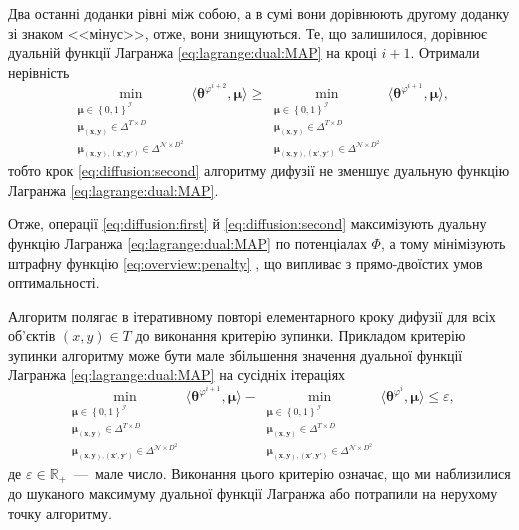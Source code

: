 Два останні доданки рівні між собою,
а в сумі вони дорівнюють другому доданку зі знаком <<мінус>>, отже,
вони знищуються.
Те, що залишилося,
дорівнює дуальній функції Лагранжа \eqref{eq:lagrange:dual:MAP}
на кроці $i + 1$.
Отримали нерівність
\begin{equation*}
    \min \limits_{\substack{\pmb{\mu} \in \left\{ 0, 1 \right\}^{\mathcal{I}} \\
                            \pmb{\mu_{\left(x, y \right)}} \in \Delta^{T \times D} \\
                            \pmb{\mu_{\left(x, y \right), \left(x', y' \right)}} \in
                                \Delta^{\mathcal{N} \times D^2}}}
        \langle \pmb{\theta}^{\varphi^{i + 2}}, \pmb{\mu} \rangle \ge
    \min \limits_{\substack{\pmb{\mu} \in \left\{ 0, 1 \right\}^{\mathcal{I}} \\
                            \pmb{\mu_{\left(x, y \right)}} \in \Delta^{T \times D} \\
                            \pmb{\mu_{\left(x, y \right), \left(x', y' \right)}} \in
                                \Delta^{\mathcal{N} \times D^2}}}
        \langle \pmb{\theta}^{\varphi^{i + 1}}, \pmb{\mu} \rangle,
\end{equation*}
тобто крок \eqref{eq:diffusion:second}
алгоритму дифузії не зменшує дуальную функцію Лагранжа
\eqref{eq:lagrange:dual:MAP}.

Отже,
операції \eqref{eq:diffusion:first} й
\eqref{eq:diffusion:second} максимізують дуальну функцію Лагранжа
\eqref{eq:lagrange:dual:MAP} по потенціалах
$\Phi$, а тому мінімізують штрафну функцію \eqref{eq:overview:penalty}
\cite{overview:savchynskyy:diffusion},
що випливає з прямо-двоїстих умов оптимальності.

Алгоритм полягає в ітеративному повторі елементарного кроку дифузії для всіх об'єктів
$\left(x, y \right) \in T$ до виконання критерію зупинки.
Прикладом критерію зупинки алгоритму може бути мале збільшення
значення дуальної функції Лагранжа \eqref{eq:lagrange:dual:MAP}
на сусідніх ітераціях
\begin{equation*}
    \min \limits_{\substack{\pmb{\mu} \in \left\{ 0, 1 \right\}^{\mathcal{I}} \\
                            \pmb{\mu_{\left(x, y \right)}} \in \Delta^{T \times D} \\
                            \pmb{\mu_{\left(x, y \right), \left(x', y' \right)}} \in
                                \Delta^{\mathcal{N} \times D^2}}}
        \langle \pmb{\theta}^{\varphi^{i + 1}}, \pmb{\mu} \rangle -
    \min \limits_{\substack{\pmb{\mu} \in \left\{ 0, 1 \right\}^{\mathcal{I}} \\
                            \pmb{\mu_{\left(x, y \right)}} \in \Delta^{T \times D} \\
                            \pmb{\mu_{\left(x, y \right), \left(x', y' \right)}} \in
                                \Delta^{\mathcal{N} \times D^2}}}
        \langle \pmb{\theta}^{\varphi^i}, \pmb{\mu} \rangle \le \varepsilon,
\end{equation*}
де $\varepsilon \in \mathbb{R}_+$~---~мале число.
Виконання цього критерію означає,
що ми наблизилися до шуканого максимуму дуальної функції Лагранжа
або потрапили на нерухому точку алгоритму.


